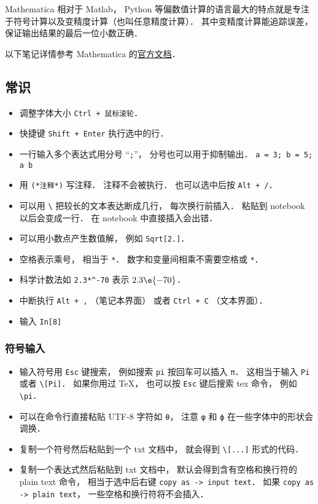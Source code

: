 

Mathematica 相对于 Matlab， Python 等偏数值计算的语言最大的特点就是专注于符号计算以及变精度计算（也叫任意精度计算）． 其中变精度计算能追踪误差， 保证输出结果的最后一位小数正确．

以下笔记详情参考 Mathematica 的\href{https://reference.wolfram.com/language/}{官方文档}．

\subsection{常识}
\begin{itemize}
\item 调整字体大小 \verb|Ctrl + 鼠标滚轮|．
\item 快捷键 \verb|Shift + Enter| 执行选中的行．
\item 一行输入多个表达式用分号 “\verb|;|”， 分号也可以用于抑制输出． \verb|a = 3; b = 5; a b|
\item 用 \verb|(*注释*)| 写注释． 注释不会被执行． 也可以选中后按 \verb|Alt + /|．
\item 可以用 \verb|\| 把较长的文本表达断成几行， 每次换行前插入． 粘贴到 notebook 以后会变成一行． 在 notebook 中直接插入会出错．
\item 可以用小数点产生数值解， 例如 \verb|Sqrt[2.]|．
\item 空格表示乘号， 相当于 \verb|*|． 数字和变量间相乘不需要空格或 \verb|*|．
\item 科学计数法如 \verb|2.3*^-70| 表示 $2.3\e{-70}$．
\item 中断执行 \verb|Alt + ,| （笔记本界面） 或者 \verb|Ctrl + C| （文本界面）．
\item 输入 \verb|In[8]|
\end{itemize}

\subsubsection{符号输入}
\begin{itemize}
\item 输入符号用 \verb|Esc| 键搜索， 例如搜索 \verb|pi| 按回车可以插入 \verb|π|． 这相当于输入 \verb|Pi| 或者 \verb|\[Pi]|． 如果你用过 TeX， 也可以按 \verb|Esc| 键后搜索 tex 命令， 例如 \verb|\pi|．
\item 可以在命令行直接粘贴 UTF-8 字符如 \verb|θ|， 注意 \verb|φ| 和 \verb|ϕ| 在一些字体中的形状会调换．
\item 复制一个符号然后粘贴到一个 txt 文档中， 就会得到 \verb|\[...]| 形式的代码．
\item 复制一个表达式然后粘贴到 txt 文档中， 默认会得到含有空格和换行符的 plain text 命令， 相当于选中后右键 \verb|copy as -> input text|． 如果 \verb|copy as -> plain text|， 一些空格和换行符将不会插入．
\end{itemize}

